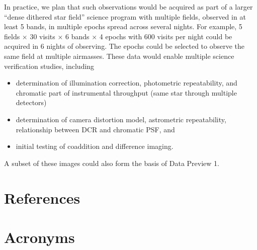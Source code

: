\documentclass[SE,authoryear,toc,lsstdraft]{lsstdoc}
\begin{document}
In practice, we plan that such observations would be acquired as part of a larger ``dense dithered star field'' science program with multiple fields, observed in at least 5 bands, in multiple epochs spread across several nights.
For example, 5 fields $\times$ 30 visits $\times$ 6 bands $\times$ 4 epochs with 600 visits per night could be acquired in 6 nights of observing.
The epochs could be selected to observe the same field at multiple airmasses.
These data would enable multiple science verification studies, including
\begin{itemize}
  \item determination of illumination correction, photometric repeatability, and chromatic part of instrumental throughput (same star through multiple detectors)
  \item determination of camera distortion model, astrometric repeatability, relationship between DCR and chromatic PSF, and
  \item initial testing of coaddition and difference imaging.
\end{itemize}

A subset of these images could also form the basis of Data Preview 1.

\appendix
\section{References} \label{sec:bib}
\renewcommand{\refname}{} %


\section{Acronyms} \label{sec:acronyms}

\end{document}
